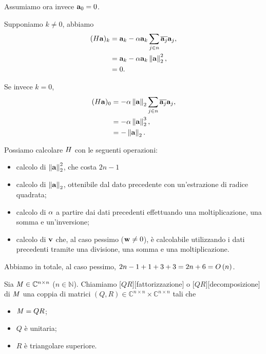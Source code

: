 \par Assumiamo ora invece $\mathbf{a}_0 = 0$.
\par Supponiamo $k \neq 0$, abbiamo
\begin{align*}
  (\HouseholderElementaryMatrix\VarVarVector)_k
  &= \VarVarVector_k - \Scalar \VarVarVector_k
    \sum_{j \in n}
    \Conjugate{\VarVarVector_j}
    \VarVarVector_j,\\
  &= \VarVarVector_k - \Scalar \VarVarVector_k
    \Norm{\VarVarVector}[2]^2,\\
  &= 0.
\end{align*}
\par Se invece $k = 0$,
\begin{align*}
  (\HouseholderElementaryMatrix\VarVarVector)_0
  &= - \Scalar \Norm{\VarVarVector}[2]
    \sum_{j \in n}
    \Conjugate{\VarVarVector_j}
    \VarVarVector_j,\\
  &= - \Scalar \Norm{\VarVarVector}[2]^3,\\
  &= - \Norm{\VarVarVector}[2].
\end{align*}
\par Possiamo calcolare $H$ con le seguenti operazioni:
\begin{itemize}
  \item calcolo di $\Norm{\VarVarVector}[2]^2$, che costa $2n - 1$
  \item calcolo di $\Norm{\VarVarVector}[2]$, ottenibile dal dato precedente con un'estrazione
    di radice quadrata;
  \item calcolo di $\alpha$ a partire dai dati precedenti effettuando una moltiplicazione,
    una somma e un'inversione;
  \item calcolo di $\mathbf{v}$ che, al caso pessimo ($\mathbf{w} \neq 0$), \`e calcolabile
    utilizzando i dati precedenti tramite una divisione, una somma e una moltiplicazione.
\end{itemize}
Abbiamo in totale, al caso pessimo,
$2n - 1 + 1 + 3 + 3 = 2n + 6 = O \left ( n \right )$. \EndProof
\begin{Definition}
  Sia $\mathit{M} \in \mathbb{C}^{n \times n}$ ($n \in \mathbb{N}$). Chiamiamo
  [$QR$][fattorizzazione]
  o
  [$QR$][decomposizione]
  di $\mathit{M}$ una coppia di matrici
  $(Q,R) \in \mathbb{C}^{n \times n} \times \mathbb{C}^{n \times n}$
  tali che
  \begin{itemize}
    \item $\mathit{M} = QR$;
    \item $Q$ \`e unitaria;
    \item $R$ \`e triangolare superiore.
  \end{itemize}
\end{Definition}
